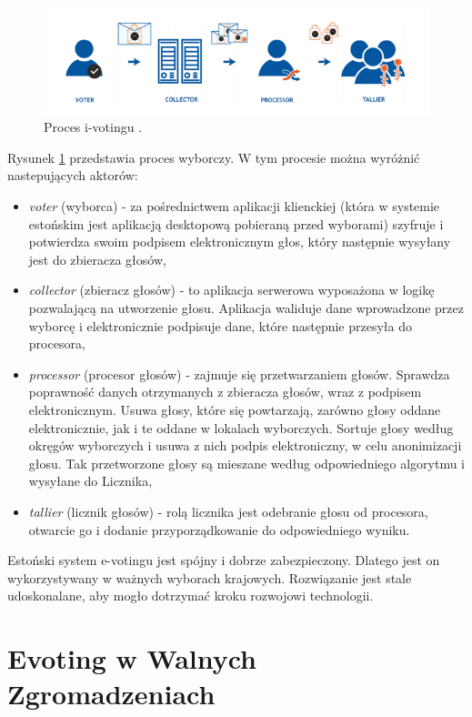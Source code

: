 \documentclass[a4paper,12pt]{book}
\begin{document}
\begin{figure}[H]
	\centering
	\includegraphics[width=\textwidth]{images/Główne częsci systemu estońskiego.png}
	\caption{Proces i-votingu \cite{estonian:voting}.}\label{estprocess}
\end {figure}

Rysunek \ref{estprocess} przedstawia proces wyborczy. W tym procesie można wyróżnić nastepujących aktorów:
\begin{itemize}
\item \textit{voter} (wyborca) - za pośrednictwem aplikacji klienckiej (która w systemie estońskim jest aplikacją desktopową pobieraną przed wyborami) szyfruje i~ potwierdza swoim podpisem elektronicznym głos, który następnie wysyłany jest do zbieracza głosów,
\item \textit{collector} (zbieracz głosów) - to aplikacja serwerowa wyposażona w logikę pozwalającą na utworzenie głosu. Aplikacja waliduje dane wprowadzone przez wyborcę i elektronicznie podpisuje dane, które następnie przesyła do procesora,
\item \textit{processor} (procesor głosów) - zajmuje się przetwarzaniem głosów. Sprawdza poprawność danych otrzymanych z zbieracza głosów, wraz z podpisem elektronicznym. Usuwa głosy, które się powtarzają, zarówno głosy oddane elektronicznie, jak i te oddane w lokalach wyborczych. Sortuje głosy według okręgów wyborczych i usuwa z nich podpis elektroniczny, w celu anonimizacji głosu. Tak przetworzone głosy są mieszane według odpowiedniego algorytmu i wysyłane do Licznika,
\item \textit{tallier} (licznik głosów) - rolą licznika jest odebranie głosu od procesora, otwarcie go i dodanie przyporządkowanie do odpowiedniego wyniku.
\end{itemize}

Estoński system e-votingu jest spójny i dobrze zabezpieczony. Dlatego jest on wykorzystywany w ważnych wyborach krajowych. Rozwiązanie jest stale udoskonalane, aby mogło dotrzymać kroku rozwojowi technologii.\cite{estonian:voting}

\section{Evoting w Walnych Zgromadzeniach}
\end{document}
